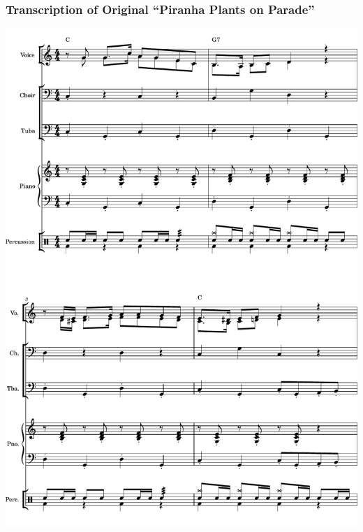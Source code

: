 \subsubsection{Transcription of Original ``Piranha Plants on Parade''}
\label{sec:sheet_music_original}
\begin{center}
	\includegraphics[page=1, width=6in]{materials/piranha_original.pdf}

\end{center}
